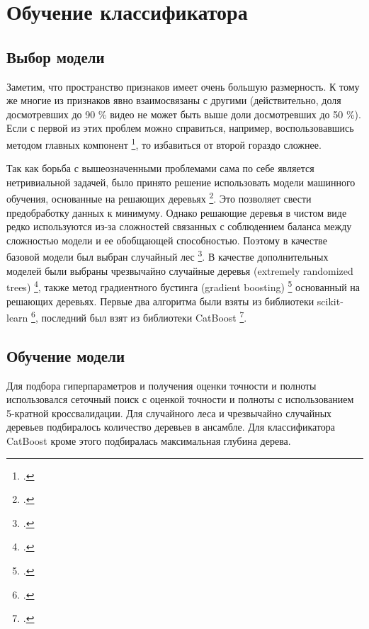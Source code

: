 \chapter{Обучение классификатора}

\section{Выбор модели}

Заметим, что пространство признаков имеет очень большую размерность. К тому же многие из признаков явно взаимосвязаны с другими (действительно, доля досмотревших до 90 \% видео не может быть выше доли досмотревших до 50 \%). Если с первой из этих проблем можно справиться, например, воспользовавшись методом главных компонент \footcite{Pearson1901}, то избавиться от второй гораздо сложнее.

Так как борьба с вышеозначенными проблемами сама по себе является нетривиальной задачей, было принято решение использовать модели машинного обучения, основанные на решающих деревьях \footcite{LeoConsultant1984}. Это позволяет свести предобработку данных к минимуму. Однако решающие деревья в чистом виде редко используются из-за сложностей связанных с соблюдением баланса между сложностью модели и ее обобщающей способностью. Поэтому в качестве базовой модели был выбран случайный лес \footcite{Ho}. В качестве дополнительных моделей были выбраны чрезвычайно случайные деревья (extremely randomized trees) \footcite{Geurts2006}, также метод градиентного бустинга (gradient boosting) \footcite{Friedman2001} основанный на решающих деревьях. Первые два алгоритма были взяты из библиотеки scikit-learn \footcite{scikit-learn}, последний был взят из библиотеки CatBoost \footcite{Prokhorenkova2017}.

\section{Обучение модели}

Для подбора гиперпараметров и получения оценки точности и полноты использовался сеточный поиск с оценкой точности и полноты с использованием 5-кратной кроссвалидации. Для случайного леса и чрезвычайно случайных деревьев подбиралось количество деревьев в ансамбле. Для классификатора CatBoost кроме этого подбиралась максимальная глубина дерева.